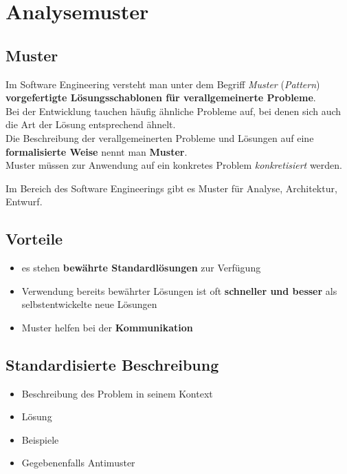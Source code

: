 \section{Analysemuster}\label{sec:analysemuster}

\subsection*{Muster}
Im Software Engineering versteht man unter dem Begriff \textit{Muster} (\textit{Pattern}) \textbf{vorgefertigte Lösungsschablonen für verallgemeinerte Probleme}.\\

\noindent
Bei der Entwicklung tauchen häufig ähnliche Probleme auf, bei denen sich auch die Art der Lösung entsprechend ähnelt.\\

\noindent
Die Beschreibung der verallgemeinerten Probleme und Lösungen auf eine \textbf{formalisierte Weise} nennt man \textbf{Muster}.\\

\noindent
Muster müssen zur Anwendung auf ein konkretes Problem \textit{konkretisiert} werden.

Im Bereich des Software Engineerings gibt es Muster für Analyse, Architektur, Entwurf.

\subsection*{Vorteile}

\begin{itemize}
    \item es stehen \textbf{bewährte Standardlösungen} zur Verfügung
    \item Verwendung bereits bewährter Lösungen ist oft \textbf{schneller und besser} als selbstentwickelte neue Lösungen
    \item Muster helfen bei der \textbf{Kommunikation}
\end{itemize}


\subsection*{Standardisierte Beschreibung}

\begin{itemize}
    \item Beschreibung des Problem in seinem Kontext
    \item Lösung
    \item Beispiele
    \item Gegebenenfalls Antimuster
\end{itemize}

